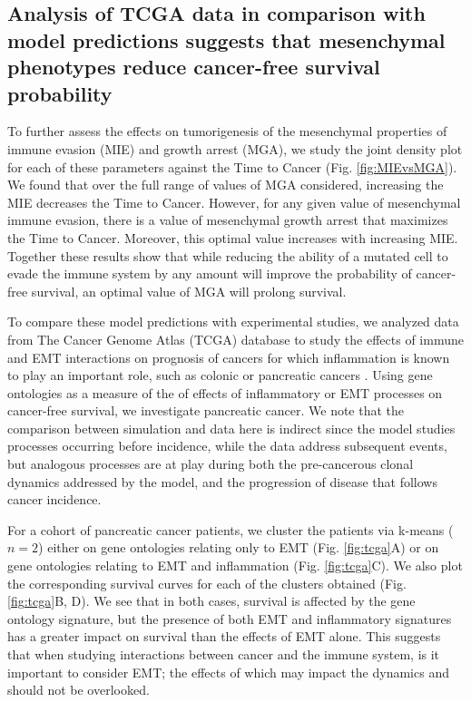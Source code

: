 \documentclass[11pt]{article}
\begin{document}
\subsection{Analysis of TCGA data in comparison with model predictions suggests that mesenchymal phenotypes reduce cancer-free survival probability}\label{tcga}

To further assess the effects on tumorigenesis of the mesenchymal properties of immune evasion (MIE) and growth arrest (MGA), we study the joint density plot for each of these parameters against the Time to Cancer (Fig. \ref{fig:MIEvsMGA}). We found that over the full range of values of MGA considered, increasing the MIE decreases the Time to Cancer. However, for any given value of mesenchymal immune evasion, there is a value of mesenchymal growth arrest that maximizes the Time to Cancer. Moreover, this optimal value increases with increasing MIE. Together these results show that while reducing the ability of a mutated cell to evade the immune system by any amount will improve the probability of cancer-free survival, an optimal value of MGA will prolong survival. 
\par 
To compare these model predictions with experimental studies, we analyzed data from The Cancer Genome Atlas (TCGA) database to study the effects of immune and EMT interactions on prognosis of cancers for which inflammation is known to play an important role, such as colonic or pancreatic cancers \cite{hu10_inflammationinduced, balkwill01_inflammation}. Using gene ontologies as a measure of the of effects of inflammatory or EMT processes on cancer-free survival, we investigate pancreatic cancer. We note that the comparison between simulation and data here is indirect since the model studies processes occurring before incidence, while the data address subsequent events, but analogous processes are at play during both the pre-cancerous clonal dynamics addressed by the model, and the progression of disease that follows cancer incidence. 
\par
For a cohort of pancreatic cancer patients, we cluster the patients via k-means ($n=2$) either on gene ontologies relating only to EMT (Fig. \ref{fig:tcga}A) or on gene ontologies relating to EMT and inflammation (Fig. \ref{fig:tcga}C). We also plot the corresponding survival curves for each of the clusters obtained (Fig. \ref{fig:tcga}B, D). We see that in both cases, survival is affected by the gene ontology signature, but the presence of both EMT and inflammatory signatures has a greater impact on survival than the effects of EMT alone. This suggests that when studying interactions between cancer and the immune system, is it important to consider EMT; the effects of which may impact the dynamics and should not be overlooked. 
\end{document}
